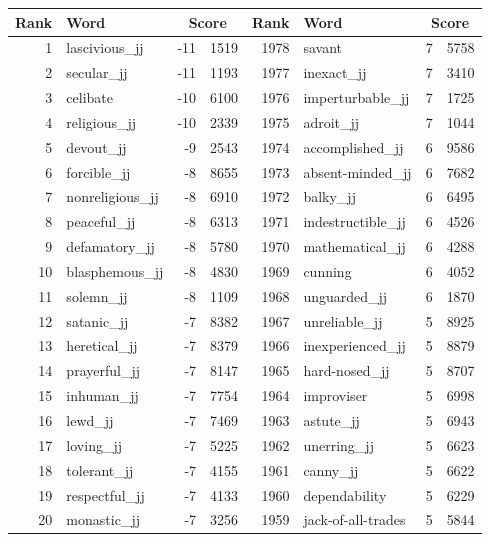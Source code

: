 \begin{table}[tbp]
    \begin{tabular}{| rlr@{.}l | rlr@{.}l |}
    \hline
    \textbf{Rank} & \textbf{Word} & \multicolumn{2}{c|}{\textbf{Score}} & \textbf{Rank} & \textbf{Word} & \multicolumn{2}{c|}{\textbf{Score}} \\
    \hline
    1 & lascivious\_jj & -11 & 1519    &    1978 & savant & 7 & 5758 \\
    2 & secular\_jj & -11 & 1193    &    1977 & inexact\_jj & 7 & 3410 \\
    3 & celibate & -10 & 6100    &    1976 & imperturbable\_jj & 7 & 1725 \\
    4 & religious\_jj & -10 & 2339    &    1975 & adroit\_jj & 7 & 1044 \\
    5 & devout\_jj & -9 & 2543    &    1974 & accomplished\_jj & 6 & 9586 \\
    6 & forcible\_jj & -8 & 8655    &    1973 & absent-minded\_jj & 6 & 7682 \\
    7 & nonreligious\_jj & -8 & 6910    &    1972 & balky\_jj & 6 & 6495 \\
    8 & peaceful\_jj & -8 & 6313    &    1971 & indestructible\_jj & 6 & 4526 \\
    9 & defamatory\_jj & -8 & 5780    &    1970 & mathematical\_jj & 6 & 4288 \\
    10 & blasphemous\_jj & -8 & 4830    &    1969 & cunning & 6 & 4052 \\
    11 & solemn\_jj & -8 & 1109    &    1968 & unguarded\_jj & 6 & 1870 \\
    12 & satanic\_jj & -7 & 8382    &    1967 & unreliable\_jj & 5 & 8925 \\
    13 & heretical\_jj & -7 & 8379    &    1966 & inexperienced\_jj & 5 & 8879 \\
    14 & prayerful\_jj & -7 & 8147    &    1965 & hard-nosed\_jj & 5 & 8707 \\
    15 & inhuman\_jj & -7 & 7754    &    1964 & improviser & 5 & 6998 \\
    16 & lewd\_jj & -7 & 7469    &    1963 & astute\_jj & 5 & 6943 \\
    17 & loving\_jj & -7 & 5225    &    1962 & unerring\_jj & 5 & 6623 \\
    18 & tolerant\_jj & -7 & 4155    &    1961 & canny\_jj & 5 & 6622 \\
    19 & respectful\_jj & -7 & 4133    &    1960 & dependability & 5 & 6229 \\
    20 & monastic\_jj & -7 & 3256    &    1959 & jack-of-all-trades & 5 & 5844 \\

\end{tabular}
\end{table}
